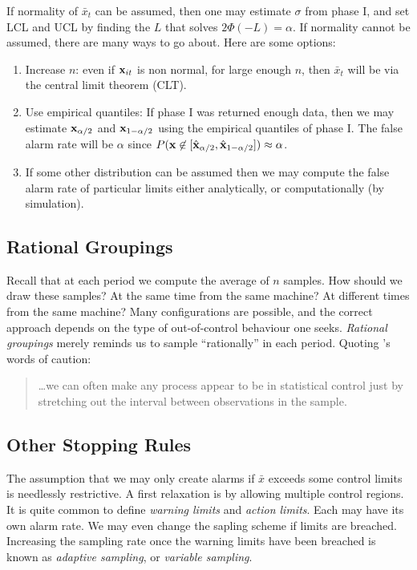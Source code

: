 \documentclass[12pt,a4paper]{report}
\theoremstyle{plain}
\theoremstyle{definition}
\newcommand{\arm}{L}
\begin{document}
If normality of $\bar{x}_t$ can be assumed, then one may estimate $\sigma$ from phase I, and set LCL and UCL by finding the $\arm$ that solves $2\Phi(-\arm)=\alpha$.
If normality cannot be assumed, there are many ways to go about. Here are some options:
\begin{enumerate}
\item Increase $n$: even if $\mathbf{x}_{it}$ is non normal, for large enough $n$, then $\bar{x}_t$ will be via the central limit theorem (CLT).
\item Use empirical quantiles: If phase I was returned enough data, then we may estimate $\mathbf{x}_{\alpha/2}$ and $\mathbf{x}_{1-\alpha/2}$ using the empirical quantiles of phase I. The false alarm rate will be $\alpha$ since $P(\mathbf{x} \not \in [\hat{\mathbf{x}}_{\alpha/2},\hat{\mathbf{x}}_{1-\alpha/2}]) \approx \alpha$.
\item If some other distribution can be assumed then we may compute the false alarm rate of particular limits either analytically, or computationally (by simulation).
\end{enumerate}




\subsection{Rational Groupings}
\label{sec:rational_grouping}
Recall that at each period we compute the average of $n$ samples. 
How should we draw these samples? 
At the same time from the same machine?
At different times from the same machine?
Many configurations are possible, and the correct approach depends on the type of out-of-control behaviour one seeks. 
\emph{Rational groupings} merely reminds us to sample ``rationally'' in each period. 
Quoting \cite{montgomery_introduction_2007}'s words of caution:
\begin{quotation}
\dots we can often make any process appear to be in statistical control just by stretching out the interval between observations in the sample.
\end{quotation}






\subsection{Other Stopping Rules}
\label{sec:stopping_rules}

The assumption that we may only create alarms if $\bar{x}$ exceeds some control limits is needlessly restrictive.
A first relaxation is by allowing multiple control regions.
It is quite common to define \emph{warning limits} and \emph{action limits}. Each may have its own alarm rate.
We may even change the sapling scheme if limits are breached. Increasing the sampling rate once the warning limits have been breached is known as \emph{adaptive sampling}, or \emph{variable sampling}.
\end{document}
